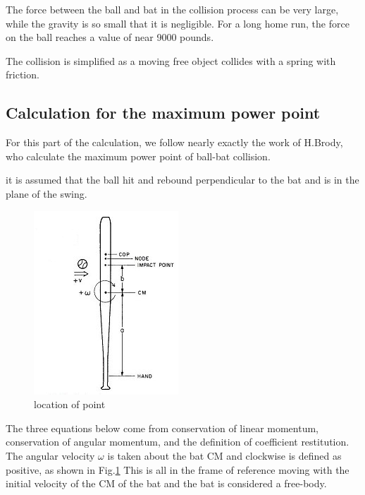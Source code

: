 \documentclass[12pt]{article}
\begin{document}
The force between the ball and bat in the collision process
can be very large, while the gravity is so small that it is negligible.
For a long home run, the force on the ball reaches a value of near 9000 pounds\cite{K.Adair2002}.

The collision is simplified as a moving free object collides with a spring with friction.


\subsection{Calculation for the maximum power point}

For this part of the calculation,
we follow nearly exactly the work of H.Brody\cite{H.Brody1986},
who calculate the maximum power point of ball-bat collision.

it is assumed that the ball hit and rebound perpendicular to the bat and is in the plane of the swing.

\begin{center}
\begin{figure}[htpb]
\centering
\includegraphics[scale=0.8]{locationofpoint}
\caption{location of point}\label{fig:locationofpoint}
\end{figure}
\end{center}

The three equations below come from
conservation of linear momentum,
conservation of angular momentum,
and the definition of coefficient restitution.
The angular velocity $\omega$ is taken about the bat CM
and clockwise is defined as positive,
as shown in Fig.\ref{fig:locationofpoint}
This is all in the frame of reference
moving with the initial velocity of the CM of the bat
and the bat is considered a free-body.
\end{document}
